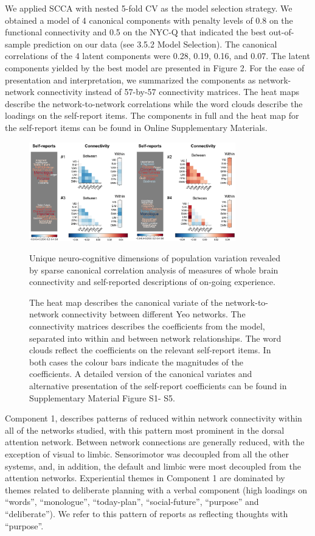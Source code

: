 We applied SCCA with nested 5-fold CV as the model selection strategy. We obtained a model of 4 canonical components with penalty levels of 0.8 on the functional connectivity and 0.5 on the NYC-Q that indicated the best out-of-sample prediction on our data (see 3.5.2 Model Selection). The canonical correlations of the 4 latent components were 0.28, 0.19, 0.16, and 0.07. The latent components yielded by the best model are presented in Figure 2. For the ease of presentation and interpretation, we summarized the components as network-network connectivity instead of 57-by-57 connectivity matrices. The heat maps describe the network-to-network correlations while the word clouds describe the loadings on the self-report items. The components in full and the heat map for the self-report items can be found in Online Supplementary Materials.

\begin{figure}
    \centering
    \includegraphics[width=0.8\textwidth]{chapters/img/study2fig2.png}
    \caption{Unique neuro-cognitive dimensions of population variation revealed by sparse canonical correlation analysis of measures of whole brain connectivity and self-reported descriptions of on-going experience.} 
    \caption*{
    \footnotesize{
    The heat map describes the canonical variate of the network-to-network connectivity between different Yeo networks. The connectivity matrices describes the coefficients from the model, separated into within and between network relationships. The word clouds reflect the coefficients on the relevant self-report items. In both cases the colour bars indicate the magnitudes of the coefficients. A detailed version of the canonical variates and alternative presentation of the self-report coefficients can be found in Supplementary Material Figure S1- S5.}
    }
    \label{fig:study2:fig2}
\end{figure}

Component 1, describes patterns of reduced within network connectivity within all of the networks studied, with this pattern most prominent in the dorsal attention network. Between network connections are generally reduced, with the exception of visual to limbic. Sensorimotor was decoupled from all the other systems, and, in addition, the default and limbic were most decoupled from the attention networks. Experiential themes in Component 1 are dominated by themes related to deliberate planning with a verbal component (high loadings on “words”, “monologue”, “today-plan”, “social-future”, “purpose” and “deliberate”). We refer to this pattern of reports as reflecting thoughts with “purpose”. 

